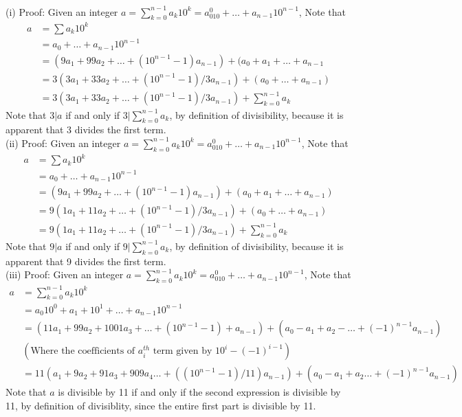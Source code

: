 \maketitle
{}\\
(i)
Proof: Given an integer $a = \sum^{n-1}_{k=0} a_k10^k = a_010^0+\dots+
    a_{n-1}10^{n-1}$, Note that\\
        \begin{align*}
            a &= \sum{a_k10^k}\\
            & = a_0+\dots+a_{n-1}10^{n-1}\\
            & = (9a_1 + 99a_2 + \dots +(10^{n-1}-1)a_{n-1}) + (a_0 + a_1 + \dots
                + a_{n-1}\\
            & = 3(3a_1 + 33 a_2 + \dots +  (10^{n-1} -1)/3 a_{n-1}) + 
            (a_0+\dots+a_{n-1})\\
            & = 3(3a_1 + 33 a_2 + \dots +  (10^{n-1} -1)/3 a_{n-1}) + 
            \sum^{n-1}_{k=0} a_k
        \end{align*}
    Note that $3|a$ if and only if $3|\sum^{n-1}_{k=0} a_k$, by definition of 
    divisibility, because it is apparent that 3 divides the first term.\\
(ii)
Proof: Given an integer $a = \sum^{n-1}_{k=0} a_k10^k = a_010^0+\dots+
    a_{n-1}10^{n-1}$, Note that\\
        \begin{align*}
            a &= \sum{a_k10^k}\\
            & = a_0+\dots+a_{n-1}10^{n-1}\\
            & = (9a_1 + 99a_2 + \dots +(10^{n-1}-1)a_{n-1}) + (a_0 + a_1 + \dots
                + a_{n-1})\\
            & = 9(1a_1 + 11 a_2 + \dots +  (10^{n-1} -1)/3 a_{n-1}) + 
            (a_0+\dots+a_{n-1})\\
            & = 9(1a_1 + 11 a_2 + \dots +  (10^{n-1} -1)/3 a_{n-1}) + 
            \sum^{n-1}_{k=0} a_k
        \end{align*}
    Note that $9|a$ if and only if $9|\sum^{n-1}_{k=0} a_k$, by definition of 
    divisibility, because it is apparent that 9 divides the first term.\\
(iii)
Proof: Given an integer $a = \sum^{n-1}_{k=0} a_k10^k = a_010^0+\dots+
    a_{n-1}10^{n-1}$, Note that\\
\begin{align*}
    a &= \sum^{n-1}_{k = 0} a_k 10^k \\
    & = a_0 10^0 + a_1 + 10^1 + \dots + a_{n-1} 10^{n-1}\\
    & = (11a_1 + 99a_2 + 1001a_3 + \dots + (10^{n-1}-1)+a_{n-1}) + (a_0 - a_1 + 
        a_2 - \dots + (-1)^{n-1} a_{n-1})\\
   &(\text{Where the coefficients of $a_i^{th}$ term given by $10^{i}-(-1)^{i-1}$})\\
   & = 11(a_1 + 9a_2+91a_3+909a_4\dots+( (10^{n-1}-1)/11)a_{n-1})+(a_0-a_1+a_2\dots
        +(-1)^{n-1}a_{n-1})
\end{align*}
Note that $a$ is divisible by 11 if and only if the second expression is divisible
by 11, by definition of divisiblity, since the entire first part is divisible by 11.

\\




